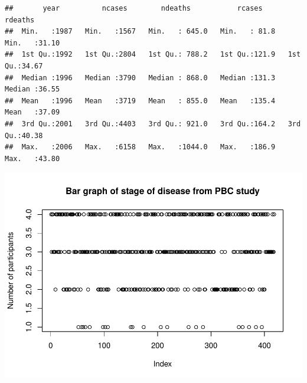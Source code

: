 \documentclass[
]{memoir}
\newenvironment{Shaded}{\begin{snugshade}}{\end{snugshade}}
\newcommand{\AttributeTok}[1]{\textcolor[rgb]{0.77,0.63,0.00}{#1}}
\newcommand{\FunctionTok}[1]{\textcolor[rgb]{0.00,0.00,0.00}{#1}}
\newcommand{\NormalTok}[1]{#1}
\newcommand{\SpecialCharTok}[1]{\textcolor[rgb]{0.00,0.00,0.00}{#1}}
\newcommand{\StringTok}[1]{\textcolor[rgb]{0.31,0.60,0.02}{#1}}
\begin{document}
\begin{verbatim}
##       year          ncases        ndeaths           rcases         rdeaths     
##  Min.   :1987   Min.   :1567   Min.   : 645.0   Min.   : 81.8   Min.   :31.10  
##  1st Qu.:1992   1st Qu.:2804   1st Qu.: 788.2   1st Qu.:121.9   1st Qu.:34.67  
##  Median :1996   Median :3790   Median : 868.0   Median :131.3   Median :36.55  
##  Mean   :1996   Mean   :3719   Mean   : 855.0   Mean   :135.4   Mean   :37.09  
##  3rd Qu.:2001   3rd Qu.:4403   3rd Qu.: 921.0   3rd Qu.:164.2   3rd Qu.:40.38  
##  Max.   :2006   Max.   :6158   Max.   :1044.0   Max.   :186.9   Max.   :43.80
\end{verbatim}

\begin{Shaded}
\end{Shaded}

\includegraphics{phcm9795-R-notes_files/figure-latex/unnamed-chunk-38-1.pdf}
\end{document}
